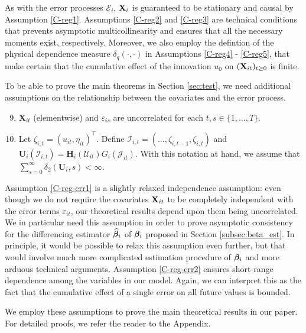 \documentclass[a4paper,12pt]{article}
\begin{document}
As with the error processes $\mathcal{E}_i$, $\mathbf{X}_i$ is guaranteed to be stationary and causal by Assumption \ref{C-reg1}. Assumptions \ref{C-reg2} and \ref{C-reg3} are technical conditions that prevents asymptotic multicollinearity and ensures that all the necessary moments exist, respectively. Moreover, we also employ the defintion of the physical dependence measure $ \delta_{q}(\cdot, \cdot)$ in Assumptions \ref{C-reg4} - \ref{C-reg5}, that make certain that the cumulative effect of the innovation $u_0$ on $(\mathbf{X}_{it})_{t\geq 0}$ is finite. 



To be able to prove the main theorems in Section \ref{sec:test}, we need additional assumptions on the relationship between the covariates and the error process.

\begin{enumerate}[label=(C\arabic*),leftmargin=1.05cm]
\setcounter{enumi}{8}
\item \label{C-reg-err1} $\mathbf{X}_{it}$ (elementwise) and $\varepsilon_{is}$ are uncorrelated for each $t, s\in \{1, \ldots, T\}$.
\item \label{C-reg-err2} Let $\zeta_{i, t} = (u_{it}, \eta_{it})^\top$. Define $\mathcal{I}_{i, t} = (\ldots, \zeta_{i, t-1}, \zeta_{i, t})$ and $\mathbf{U}_i(\mathcal{I}_{i, t}) =  \mathbf{H}_i(\mathcal{U}_{it})G_i(\mathcal{J}_{it})$. With this notation at hand, we assume that $\sum_{s=0}^\infty \delta_2(\mathbf{U}_i, s)<\infty$.

\end{enumerate}
Assumption \ref{C-reg-err1} is a slightly relaxed independence assumption: even though we do not require the covariates $\mathbf{X}_{it}$ to be completely independent with the error terms $\varepsilon_{it}$, our theoretical results depend upon them being uncorrelated. We in particular need this assumption in order to prove asymptotic consistency for the differencing estimator $\widehat{\bm{\beta}}_i$ of $\bm{\beta}_i$ proposed in Section \ref{subsec:beta_est}. In principle, it would be possible to relax this assumption even further, but that would involve much more complicated estimation procedure of $\bm{\beta}_i$ and more arduous technical arguments. Assumption \ref{C-reg-err2} ensures short-range dependence among the variables in our model. Again, we can interpret this as the fact that the cumulative effect of a single error on all future values is bounded.

We employ these assumptions to prove the main theoretical results in our paper. For detailed proofs, we refer the reader to the Appendix.
\end{document}

